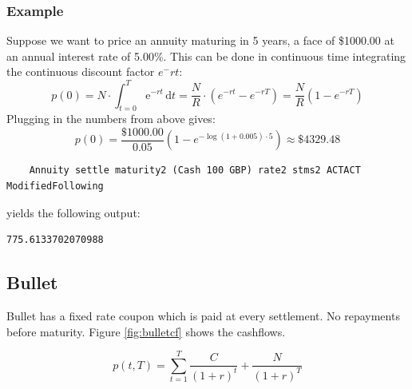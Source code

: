 \documentclass[11pt,a4paper]{article}
\numberwithin{equation}{section}
\begin{document}
	\subsubsection{Example}
	Suppose we want to price an annuity maturing in 5 years, a face of \$1000.00 at an annual interest rate of 5.00\%.
	This can be done in continuous time integrating the continuous discount factor $e^-rt$:
	\[
	p(0)=N\cdot \int_{t=0}^T \mathrm{e}^{-rt}\,\mathrm{d}t=\frac{N}{R}\cdot (e^{-rt}-e^{-rT})=\frac{N}{R}(1-e^{-rT})
	\]
	Plugging in the numbers from above gives:
	\[
	p(0)=\frac{\$1000.00}{0.05}(1-e^{-\log(1+0.005)\cdot 5})\approx \$4329.48
	\]
	\begin{lstlisting}
	Annuity settle maturity2 (Cash 100 GBP) rate2 stms2 ACTACT ModifiedFollowing
	\end{lstlisting}
	yields the following output:
	\FrameSep
	\begin{lstlisting}[style=Output]
	775.6133702070988
	\end{lstlisting}

	\subsection{Bullet}

	Bullet has a fixed rate coupon which is paid at every settlement. No repayments before maturity. Figure \ref{fig:bulletcf} shows the cashflows.

	\[ p(t,T) = \sum_{t=1}^{T}\frac{C}{(1+r)^t} + \frac{N}{(1+r)^T} \]
\end{document}
